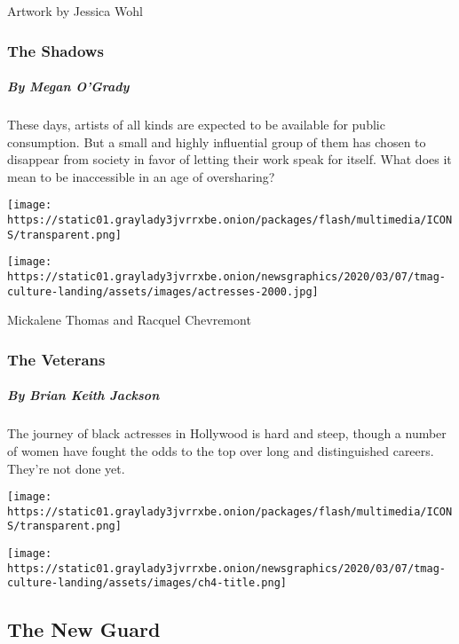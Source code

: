 Artwork by Jessica Wohl

\hypertarget{the-shadows}{%
\subsubsection{The Shadows}\label{the-shadows}}

\hypertarget{by-megan-ogrady}{%
\subparagraph{By Megan O'Grady}\label{by-megan-ogrady}}

These days, artists of all kinds are expected to be available for public
consumption. But a small and highly influential group of them has chosen
to disappear from society in favor of letting their work speak for
itself. What does it mean to be inaccessible in an age of oversharing?

\href{https://www.nytimes3xbfgragh.onion/interactive/2020/04/13/t-magazine/black-actresses-bassett-berry-blige-henson-whitfield-elise.html}{}

\texttt{[image: https://static01.graylady3jvrrxbe.onion/packages/flash/multimedia/ICONS/transparent.png]}

\texttt{[image: https://static01.graylady3jvrrxbe.onion/newsgraphics/2020/03/07/tmag-culture-landing/assets/images/actresses-2000.jpg]}

Mickalene Thomas and Racquel Chevremont

\hypertarget{the-veterans}{%
\subsubsection{The Veterans}\label{the-veterans}}

\hypertarget{by-brian-keith-jackson}{%
\subparagraph{By Brian Keith Jackson}\label{by-brian-keith-jackson}}

The journey of black actresses in Hollywood is hard and steep, though a
number of women have fought the odds to the top over long and
distinguished careers. They're not done yet.

\texttt{[image: https://static01.graylady3jvrrxbe.onion/packages/flash/multimedia/ICONS/transparent.png]}

\texttt{[image: https://static01.graylady3jvrrxbe.onion/newsgraphics/2020/03/07/tmag-culture-landing/assets/images/ch4-title.png]}

\hypertarget{the-new-guard}{%
\subsection{The New Guard}\label{the-new-guard}}

